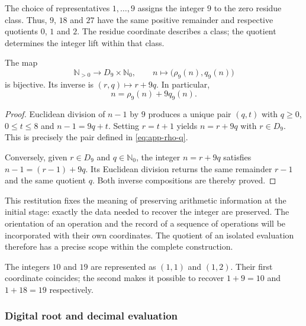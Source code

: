 The choice of representatives $1,\ldots,9$ assigns the integer $9$ to the zero residue class. Thus, $9$, $18$ and $27$ have the same positive remainder and respective quotients $0$, $1$ and $2$. The residue coordinate describes a class; the quotient determines the integer lift within that class.

\begin{bloqueindivisible}
\begin{proposicion}
\label{thm:app-reconstruccion}
The map
\begin{equation}
 \mathbb N_{>0}\longrightarrow D_9\times\mathbb N_0,
 \qquad n\longmapsto\bigl(\rho_9(n),q_9(n)\bigr)
\end{equation}
is bijective. Its inverse is $(r,q)\mapsto r+9q$. In particular,
\begin{equation}
 n=\rho_9(n)+9q_9(n).
 \label{eq:app-restitution}
\end{equation}
\end{proposicion}

\begin{proof}
Euclidean division of $n-1$ by $9$ produces a unique pair $(q,t)$ with $q\geq0$, $0\leq t\leq8$ and $n-1=9q+t$. Setting $r=t+1$ yields $n=r+9q$ with $r\in D_9$. This is precisely the pair defined in \eqref{eq:app-rho-q}.

Conversely, given $r\in D_9$ and $q\in\mathbb N_0$, the integer $n=r+9q$ satisfies $n-1=(r-1)+9q$. Its Euclidean division returns the same remainder $r-1$ and the same quotient $q$. Both inverse compositions are thereby proved.
\end{proof}
\end{bloqueindivisible}

This restitution fixes the meaning of preserving arithmetic information at the initial stage: exactly the data needed to recover the integer are preserved. The orientation of an operation and the record of a sequence of operations will be incorporated with their own coordinates. The quotient of an isolated evaluation therefore has a precise scope within the complete construction.

\begin{ejemplo}
The integers $10$ and $19$ are represented as $(1,1)$ and $(1,2)$. Their first coordinate coincides; the second makes it possible to recover $1+9=10$ and $1+18=19$ respectively.
\end{ejemplo}

\subsubsection{Digital root and decimal evaluation}

